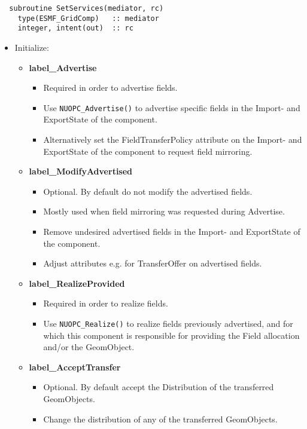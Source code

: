 \begin{verbatim}  subroutine SetServices(mediator, rc)
    type(ESMF_GridComp)   :: mediator
    integer, intent(out)  :: rc
\end{verbatim}

\begin{itemize}
  \item Initialize:
  \begin{itemize}
    \item {\bf label\_Advertise}
    \begin{itemize}
      \item Required in order to advertise fields.
      \item Use {\tt NUOPC\_Advertise()} to advertise specific fields in the Import- and ExportState of the component.
      \item Alternatively set the FieldTransferPolicy attribute on the Import- and ExportState of the component to request field mirroring.
    \end{itemize}
    \item {\bf label\_ModifyAdvertised}
    \begin{itemize}
      \item Optional. By default do not modify the advertised fields.
      \item Mostly used when field mirroring was requested during Advertise.
      \item Remove undesired advertised fields in the Import- and ExportState of the component.
      \item Adjust attributes e.g. for TransferOffer on advertised fields.
    \end{itemize}
    \item {\bf label\_RealizeProvided}
    \begin{itemize}
      \item Required in order to realize fields.
      \item Use {\tt NUOPC\_Realize()} to realize fields previously advertised, and for which this component is responsible for providing the Field allocation and/or the GeomObject.
    \end{itemize}
    \item {\bf label\_AcceptTransfer}
    \begin{itemize}
      \item Optional. By default accept the Distribution of the transferred GeomObjects.
      \item Change the distribution of any of the transferred GeomObjects.

\end{itemize}
\end{itemize}
\end{itemize}
